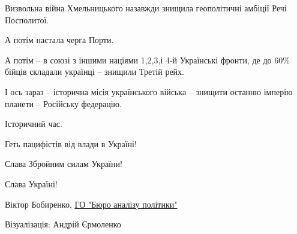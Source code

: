 Визвольна війна Хмельницького назавжди знищила геополітичні амбіції Речі
Посполитої.

А потім настала черга Порти.

А потім – в союзі з іншими націями 1,2,3,і 4-й Українські фронти, де до 60\%
бійців складали українці – знищили Третій рейх.

І ось зараз – історична місія українського війська – знищити останню імперію
планети – Російську федерацію.

Історичний час.

Геть пацифістів від влади в Україні!

Слава Збройним силам України!

Слава Україні!

Віктор Бобиренко, 
\href{https://www.facebook.com/BureauOfPolicyAnalsys/}{%
ГО "Бюро аналізу політики"}

Візуалізація: Андрій Єрмоленко

